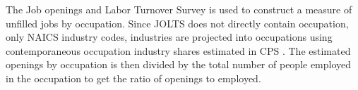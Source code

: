 \documentclass[12pt]{article}
\begin{document}








The Job openings and Labor Turnover Survey \cite{JOLTS} is used to construct a measure of unfilled jobs by occupation. Since JOLTS does not directly contain occupation, only NAICS industry codes, industries are projected into occupations using contemporaneous occupation industry shares estimated in CPS \cite{IPUMSCPS}. The estimated openings by occupation is then divided by the total number of people employed in the occupation to get the ratio of openings to employed.

\end{document}

